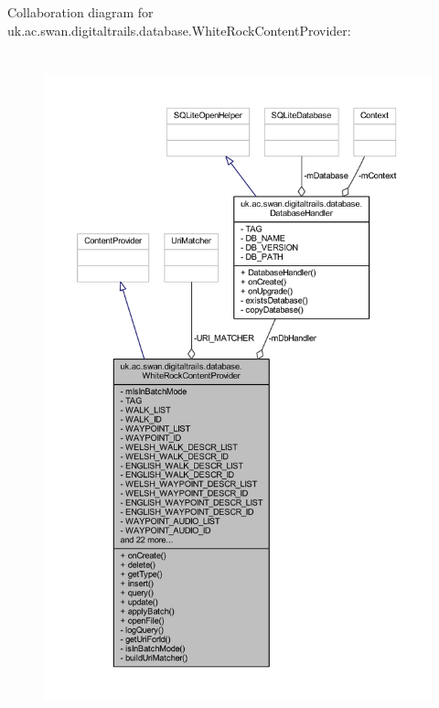 Collaboration diagram for uk.\+ac.\+swan.\+digitaltrails.\+database.\+White\+Rock\+Content\+Provider\+:
\nopagebreak
\begin{figure}[H]
\begin{center}
\leavevmode
\includegraphics[height=550pt]{classuk_1_1ac_1_1swan_1_1digitaltrails_1_1database_1_1_white_rock_content_provider__coll__graph}
\end{center}
\end{figure}
